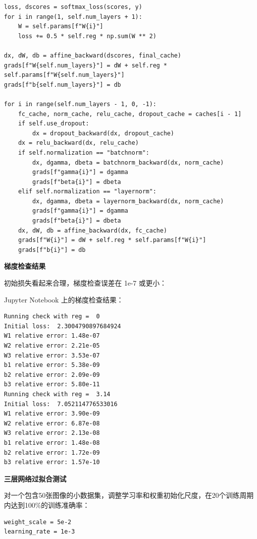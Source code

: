 \begin{lstlisting}[style=cleanpython]
loss, dscores = softmax_loss(scores, y)
for i in range(1, self.num_layers + 1):
    W = self.params[f"W{i}"]
    loss += 0.5 * self.reg * np.sum(W ** 2)

dx, dW, db = affine_backward(dscores, final_cache)
grads[f"W{self.num_layers}"] = dW + self.reg * self.params[f"W{self.num_layers}"]
grads[f"b{self.num_layers}"] = db

for i in range(self.num_layers - 1, 0, -1):
    fc_cache, norm_cache, relu_cache, dropout_cache = caches[i - 1]
    if self.use_dropout:
        dx = dropout_backward(dx, dropout_cache)
    dx = relu_backward(dx, relu_cache)
    if self.normalization == "batchnorm":
        dx, dgamma, dbeta = batchnorm_backward(dx, norm_cache)
        grads[f"gamma{i}"] = dgamma
        grads[f"beta{i}"] = dbeta
    elif self.normalization == "layernorm":
        dx, dgamma, dbeta = layernorm_backward(dx, norm_cache)
        grads[f"gamma{i}"] = dgamma
        grads[f"beta{i}"] = dbeta
    dx, dW, db = affine_backward(dx, fc_cache)
    grads[f"W{i}"] = dW + self.reg * self.params[f"W{i}"]
    grads[f"b{i}"] = db
\end{lstlisting}

\textbf{梯度检查结果}

初始损失看起来合理，梯度检查误差在 1e-7 或更小：

Jupyter Notebook 上的梯度检查结果：

\begin{lstlisting}[style=cleanpython]
Running check with reg =  0
Initial loss:  2.3004790897684924
W1 relative error: 1.48e-07
W2 relative error: 2.21e-05
W3 relative error: 3.53e-07
b1 relative error: 5.38e-09
b2 relative error: 2.09e-09
b3 relative error: 5.80e-11
Running check with reg =  3.14
Initial loss:  7.052114776533016
W1 relative error: 3.90e-09
W2 relative error: 6.87e-08
W3 relative error: 2.13e-08
b1 relative error: 1.48e-08
b2 relative error: 1.72e-09
b3 relative error: 1.57e-10
\end{lstlisting}

\textbf{三层网络过拟合测试}

对一个包含50张图像的小数据集，调整学习率和权重初始化尺度，在20个训练周期内达到100\%的训练准确率：

\begin{lstlisting}[style=cleanpython]
weight_scale = 5e-2
learning_rate = 1e-3
\end{lstlisting}

